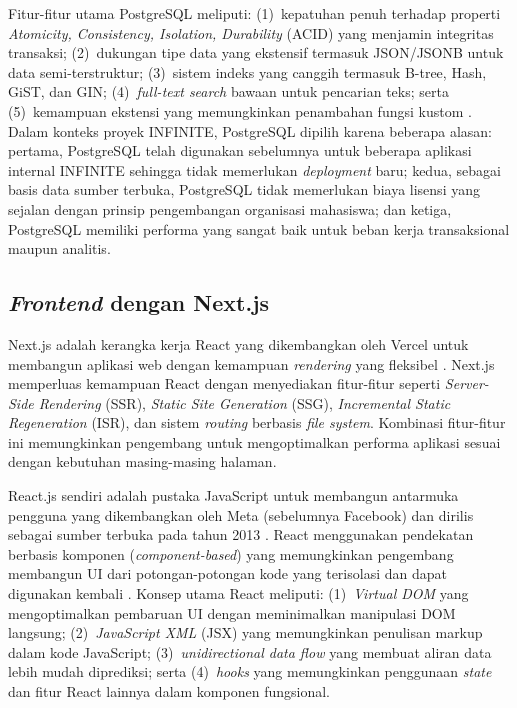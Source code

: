 Fitur-fitur utama PostgreSQL meliputi: (1)~kepatuhan penuh terhadap properti \textit{Atomicity, Consistency, Isolation, Durability} (ACID) yang menjamin integritas transaksi; (2)~dukungan tipe data yang ekstensif termasuk JSON/JSONB untuk data semi-terstruktur; (3)~sistem indeks yang canggih termasuk B-tree, Hash, GiST, dan GIN; (4)~\textit{full-text search} bawaan untuk pencarian teks; serta (5)~kemampuan ekstensi yang memungkinkan penambahan fungsi kustom \citep{Ferrari_2023_PostgreSQL}. Dalam konteks proyek INFINITE, PostgreSQL dipilih karena beberapa alasan: pertama, PostgreSQL telah digunakan sebelumnya untuk beberapa aplikasi internal INFINITE sehingga tidak memerlukan \textit{deployment} baru; kedua, sebagai basis data sumber terbuka, PostgreSQL tidak memerlukan biaya lisensi yang sejalan dengan prinsip pengembangan organisasi mahasiswa; dan ketiga, PostgreSQL memiliki performa yang sangat baik untuk beban kerja transaksional maupun analitis.

\subsection{\textit{Frontend} dengan Next.js}

Next.js adalah kerangka kerja React yang dikembangkan oleh Vercel untuk membangun aplikasi web dengan kemampuan \textit{rendering} yang fleksibel \citep{Nextjs_2026_Docs}. Next.js memperluas kemampuan React dengan menyediakan fitur-fitur seperti \textit{Server-Side Rendering} (SSR), \textit{Static Site Generation} (SSG), \textit{Incremental Static Regeneration} (ISR), dan sistem \textit{routing} berbasis \textit{file system}. Kombinasi fitur-fitur ini memungkinkan pengembang untuk mengoptimalkan performa aplikasi sesuai dengan kebutuhan masing-masing halaman.

React.js sendiri adalah pustaka JavaScript untuk membangun antarmuka pengguna yang dikembangkan oleh Meta (sebelumnya Facebook) dan dirilis sebagai sumber terbuka pada tahun 2013 \citep{React_2026_Docs}. React menggunakan pendekatan berbasis komponen (\textit{component-based}) yang memungkinkan pengembang membangun UI dari potongan-potongan kode yang terisolasi dan dapat digunakan kembali \citep{Kaushalya_2021_ReactComponentMigration}. Konsep utama React meliputi: (1)~\textit{Virtual DOM} yang mengoptimalkan pembaruan UI dengan meminimalkan manipulasi DOM langsung; (2)~\textit{JavaScript XML} (JSX) yang memungkinkan penulisan markup dalam kode JavaScript; (3)~\textit{unidirectional data flow} yang membuat aliran data lebih mudah diprediksi; serta (4)~\textit{hooks} yang memungkinkan penggunaan \textit{state} dan fitur React lainnya dalam komponen fungsional.

